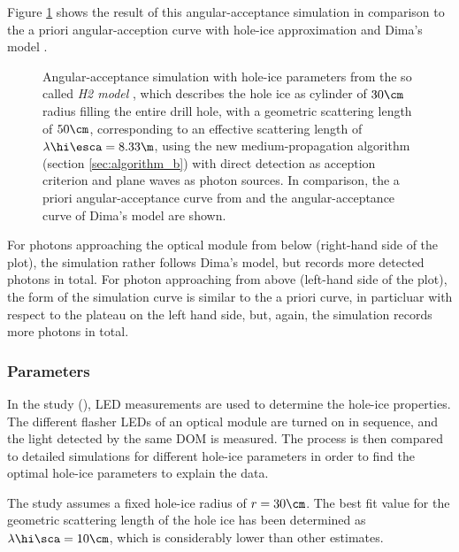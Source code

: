
Figure \ref{fig:xaeg2Mee} shows the result of this angular-acceptance simulation in comparison to the a priori angular-acception curve with hole-ice approximation \cite{icepaper} and Dima's model \cite{flasherdataderivedicemodels}.

\begin{figure}[htbp]
  \caption{Angular-acceptance simulation with hole-ice parameters from the so called \textit{H2 model} \cite{holeicestudieswithyag}, which describes the hole ice as cylinder of $30\cm$ radius filling the entire drill hole, with a geometric scattering length of $50\cm$, corresponding to an effective scattering length of $\lambda\hi\esca = 8.33\m$, using the new medium-propagation algorithm (section \ref{sec:algorithm_b}) with direct detection as acception criterion and plane waves as photon sources. In comparison, the a priori angular-acceptance curve from \cite{icepaper} and the angular-acceptance curve of Dima's model \cite{flasherdataderivedicemodels} are shown.}
  \label{fig:xaeg2Mee}
\end{figure}

For photons approaching the optical module from below (right-hand side of the plot), the simulation rather follows Dima's model, but records more detected photons in total. For photon approaching from above (left-hand side of the plot), the form of the simulation curve is similar to the a priori curve, in particluar with respect to the plateau on the left hand side, but, again, the simulation records more photons in total.


\subsubsection{ Parameters}

In the  study (), LED measurements are used to determine the hole-ice properties. The different flasher LEDs of an optical module are turned on in sequence, and the light detected by the same DOM is measured. The process is then compared to detailed  simulations for different hole-ice parameters in order to find the optimal hole-ice parameters to explain the data. \cite{martindardupdate}\cite{martinspicehddard}

The  study assumes a fixed hole-ice radius of $r=30\cm$. The best fit value for the geometric scattering length of the hole ice has been determined as $\lambda\hi\sca = 10\cm$, which is considerably lower than other estimates. \cite{martindardupdate}

